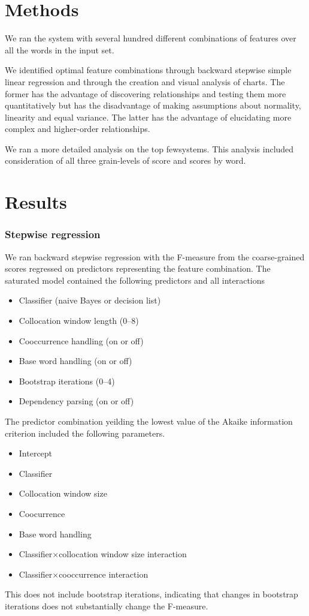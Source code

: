\documentclass{article}
\begin{document}
\section{Methods}
\newcommand\few{few}
We ran the system with several hundred different combinations of features over all the words in the input set.

We identified optimal feature combinations through backward stepwise simple linear regression
and through the creation and visual analysis of charts. The former has the
advantage of discovering relationships and testing them more quantitatively
but has the disadvantage of making assumptions about normality, linearity and equal variance.
The latter has the advantage of elucidating more complex and higher-order relationships.

We ran a more detailed analysis on the top \few systems.
This analysis included consideration of all three grain-levels of score and scores by word.


\section{Results}

\subsubsection{Stepwise regression}
We ran backward stepwise regression with the F-measure from the coarse-grained scores
regressed on predictors representing the feature combination.
The saturated model contained the following predictors and all interactions
\begin{itemize}
\item Classifier (naive Bayes or decision list)
\item Collocation window length (0--8)
\item Cooccurrence handling (on or off)
\item Base word handling (on or off)
\item Bootstrap iterations (0--4)
\item Dependency parsing (on or off)
\end{itemize}
The predictor combination yeilding the lowest value of the Akaike information criterion
included the following parameters.
\begin{itemize}
\item Intercept
\item Classifier
\item Collocation window size
\item Coocurrence
\item Base word handling
\item Classifier$\times$collocation window size interaction
\item Classifier$\times$cooccurrence interaction
\end{itemize}
This does not include bootstrap iterations, indicating that changes
in bootstrap iterations does not substantially change the F-measure.
\end{document}
